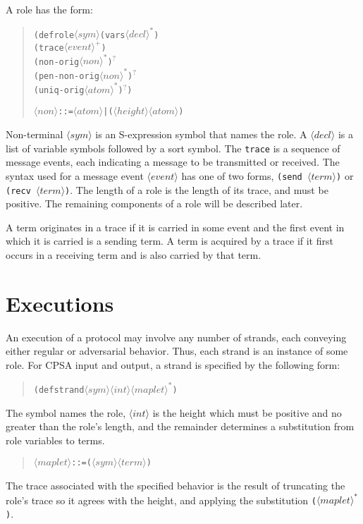 \documentclass[12pt]{article}
\newcommand{\nterm}[1]{\ensuremath{\langle\mathit{#1}\rangle}}
\newcommand{\nterms}[1]{\ensuremath{\nterm{#1}^\ast}}
\newcommand{\ntermp}[1]{\ensuremath{\nterm{#1}^+}}
\newcommand{\ntermo}[1]{#1$^?$}
\begin{document}
A role has the form:
\begin{quote}
\begin{alltt}
(defrole \nterm{sym} (vars \nterms{decl})
\quad (trace \ntermp{event})
\quad \ntermo{(non-orig \nterms{non})}
\quad \ntermo{(pen-non-orig \nterms{non})}
\quad \ntermo{(uniq-orig \nterms{atom})}\iffalse
\quad \nterm{annos}\fi)

\nterm{non} ::= \nterm{atom} | (\nterm{height} \nterm{atom})
\end{alltt}
\end{quote}
Non-terminal \nterm{sym} is an S-expression symbol that names the
role.  A \nterm{decl} is a list of variable symbols followed by a sort
symbol.  The \texttt{trace} is a sequence of message events, each
indicating a message to be transmitted or received.  The syntax used
for a message event \nterm{event} has
one of two forms, \texttt{(send \nterm{term})} or \texttt{(recv
  \nterm{term})}.  The length of a role is the length of its trace,
and must be positive.  The remaining components of a role will be
described later.

A term originates in a trace if it is carried in some event
and the first event in which it is carried is a sending term.
A term is acquired by a trace if it first occurs in a receiving term
and is also carried by that term.

\section{Executions}

An execution of a protocol may involve any number of strands, each
conveying either regular or adversarial behavior.  Thus, each strand
is an instance of some role.  For CPSA input and output, a strand is
specified by the following form:
\begin{quote}
\begin{alltt}
(defstrand \nterm{sym} \nterm{int} \nterms{maplet})
\end{alltt}
\end{quote}
The symbol names the role, \nterm{int} is the height which must be
positive and no greater than the role's length, and the remainder
determines a substitution from role variables to terms.
\begin{quote}
\begin{alltt}
\nterm{maplet} ::= (\nterm{sym} \nterm{term})
\end{alltt}
\end{quote}
The trace associated with the specified behavior is the result of
truncating the role's trace so it agrees with the height, and applying
the substitution \texttt{(\nterms{maplet})}.
\end{document}
